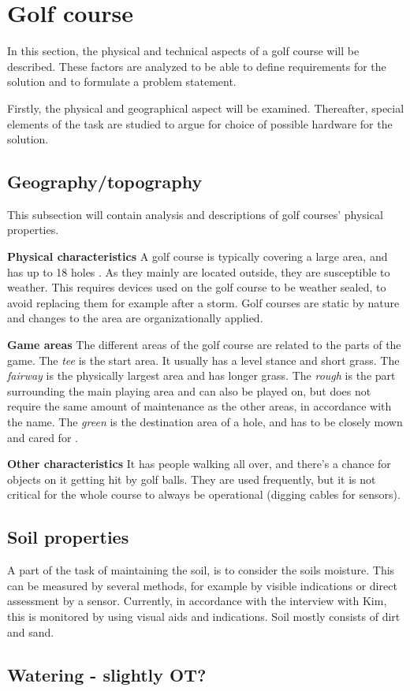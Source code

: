 \section{Golf course}
In this section, the physical and technical aspects of a golf course will be described. These factors are analyzed to be able to define requirements for the solution and to formulate a problem statement.

Firstly, the physical and geographical aspect will be examined. Thereafter, special elements of the task are studied to argue for choice of possible hardware for the solution. 

\subsection{Geography/topography}
This subsection will contain analysis and descriptions of golf courses' physical properties.

\textbf{Physical characteristics}
A golf course is typically covering a large area, and has up to 18 holes \cite{golfCourse}. 
As they mainly are located outside, they are susceptible to weather. This requires devices used on the golf course to be weather sealed, to avoid replacing them for example after a storm.
Golf courses are static by nature and changes to the area are organizationally applied. 

\textbf{Game areas}
The different areas of the golf course are related to the parts of the game. The \textit{tee} is the start area. It usually has a level stance and short grass. The \textit{fairway} is the physically largest area and has longer grass. The \textit{rough} is the part surrounding the main playing area and can also be played on, but does not require the same amount of maintenance as the other areas, in accordance with the name. The \textit{green} is the destination area of a hole, and has to be closely mown and cared for . 

\cite{golfGrass}

\textbf{Other characteristics}
It has people walking all over, and there's a chance for objects on it getting hit by golf balls. 
They are used frequently, but it is not critical for the whole course to always be operational (digging cables for sensors). 



\subsection{Soil properties}
A part of the task of maintaining the soil, is to consider the soils moisture. This can be measured by several methods, for example by visible indications or direct assessment by a sensor. Currently, in accordance with the interview with Kim, this is monitored by using visual aids and indications. Soil mostly consists of dirt and sand.


\subsection{Watering - slightly OT?}
